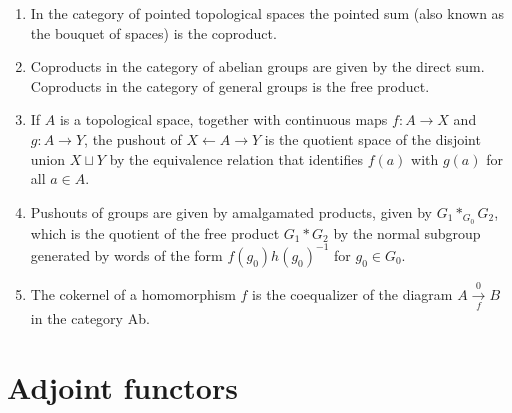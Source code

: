 \begin{example}[Colimits]
\begin{enumerate}
        \item In the category of pointed topological spaces the pointed sum (also known as the bouquet of spaces) is the coproduct.
        \item Coproducts in the category of abelian groups are given by the direct sum. Coproducts in the category of general groups is the free product.
        \item If $A$ is a topological space, together with continuous maps $f: A \rightarrow X$ and $g: A \rightarrow Y$, the pushout of $X \leftarrow A \rightarrow Y$ is the quotient space of the disjoint union $X \sqcup Y$ by the equivalence relation that identifies $f(a)$ with $g(a)$ for all $a \in A$.
        \item Pushouts of groups are given by amalgamated products, given by $G_1 *_{G_0} G_2$, which is the quotient of the free product $G_1 * G_2$ by the normal subgroup generated by words of the form $f\left(g_0\right) h\left(g_0\right)^{-1}$ for $g_0 \in G_0$.
        \item The cokernel of a homomorphism $f$ is the coequalizer of the diagram $A \underset{f}{\stackrel{0 }{\longrightarrow}} B$ in the category Ab.
    \end{enumerate}
\end{example}




\section{Adjoint functors}

